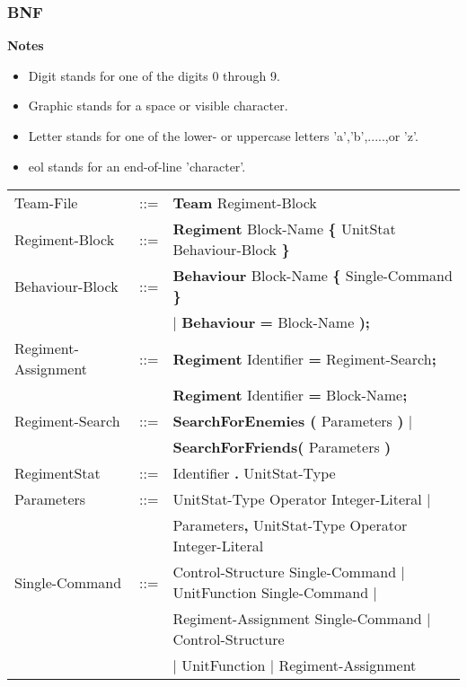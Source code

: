 	\subsubsection{BNF}
		{\bf Notes}
		\begin{itemize}
			\item Digit stands for one of the digits 0 through 9.
			\item Graphic stands for a space or visible character.
			\item Letter stands for one of the lower- or uppercase letters 'a','b',.....,or 'z'.
			\item eol stands for an end-of-line 'character'.
		\end{itemize}
		\begin{center}
				\begin{longtable}{ l l l }
				\endfirsthead
				\endhead
				Team-File		   &	::=	 & {\bf Team} Regiment-Block \\
				Regiment-Block     &	::=	 & {\bf Regiment} Block-Name {\bf \{ } UnitStat Behaviour-Block \bf{\} }\\
				Behaviour-Block	   &	::=	 & {\bf Behaviour} Block-Name {\bf \{} Single-Command {\bf \}}  \\
								   &         & $\mid$ {\bf Behaviour} {\bf = } Block-Name {\bf );} \\
				Regiment-Assignment&    ::=  &{\bf Regiment} Identifier {\bf =} Regiment-Search{\bf ;}\\
								   &         &{\bf Regiment} Identifier {\bf =} Block-Name{\bf ;}\\
				Regiment-Search	   &	::=	 &{\bf SearchForEnemies (} Parameters {\bf )} $\mid$\\
								   &		 & {\bf SearchForFriends(} Parameters {\bf )}	 \\
				RegimentStat 	   &	::=  & Identifier {\bf.} UnitStat-Type \\
				Parameters		   &	::=	 & UnitStat-Type Operator Integer-Literal $\mid$\\
								   &		 & Parameters{\bf ,} UnitStat-Type Operator Integer-Literal\\
				Single-Command     &	::=  & Control-Structure Single-Command $\mid$ UnitFunction Single-Command $\mid$ \\
								   &		 & Regiment-Assignment Single-Command $\mid$ Control-Structure \\
								   &		 & $\mid$ UnitFunction $\mid$ Regiment-Assignment \\

\end{longtable}
\end{center}
